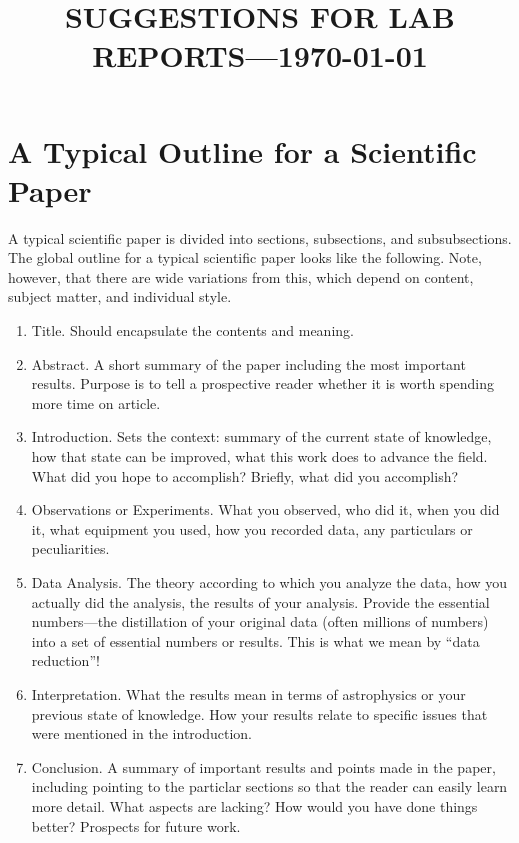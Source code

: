 \documentclass[11pt,preprint]{aastex}
\begin{document}
\title{SUGGESTIONS FOR LAB REPORTS---\today}

\section{A Typical Outline for a Scientific Paper}

A typical scientific paper is divided into sections, subsections, and
subsubsections. The global outline for a typical scientific paper looks
like the following. Note, however, that there are wide variations from
this, which depend on content, subject matter, and individual
style. \begin{enumerate}

\item Title. Should encapsulate the contents and meaning.

\item Abstract. A short summary of the paper including the most important
  results.  Purpose is to tell a prospective reader whether it is worth
  spending more time on article.
  
\item Introduction. Sets the context: summary of the current state of
  knowledge, how that state can be improved, what this work does to
  advance the field. What did you hope to accomplish? Briefly, what did you
  accomplish? 

\item Observations or Experiments. What you observed, who did it, when you
  did it, what equipment you used, how you recorded data, any particulars
  or peculiarities.

\item Data Analysis. The theory according to which you analyze the data,
  how you actually did the analysis, the results of your analysis. Provide
  the essential numbers---the distillation of your original data (often
  millions of numbers) into a set of essential numbers or results. This is
  what we mean by ``data reduction''!

\item Interpretation. What the results mean in terms of astrophysics or
  your previous state of knowledge. How your results relate to specific
  issues that were mentioned in the introduction.

\item Conclusion. A summary of important results and points made in the
  paper, including pointing to the particlar sections so that the reader
  can easily learn more detail. What aspects are lacking? How would
  you have done things better? Prospects for future work.
  

\end{enumerate}
\end{document}
